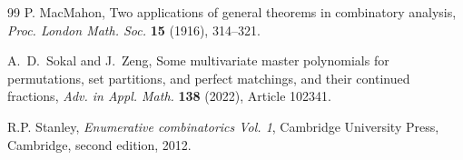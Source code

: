 \documentclass[12pt]{article}
\numberwithin{equation}{section}
\theoremstyle{plain}
\begin{document}
\begin{thebibliography}{99}
	 P. MacMahon, Two applications of general theorems in combinatory analysis,
	 {\em Proc. London Math. Soc.}  {\bf 15} (1916), 314--321.
	 
	 
	 
	 
	 A.~D.~Sokal and J.~Zeng, Some multivariate master polynomials for permutations, set partitions, and perfect matchings, and their continued fractions,
	 \emph{Adv. in Appl. Math.} \textbf{138} (2022), Article 102341.
	 
	  R.P. Stanley, \emph{Enumerative combinatorics Vol. 1}, Cambridge University Press, Cambridge, second edition, 2012.
		
	  
		
	\end{thebibliography}
\end{document}
